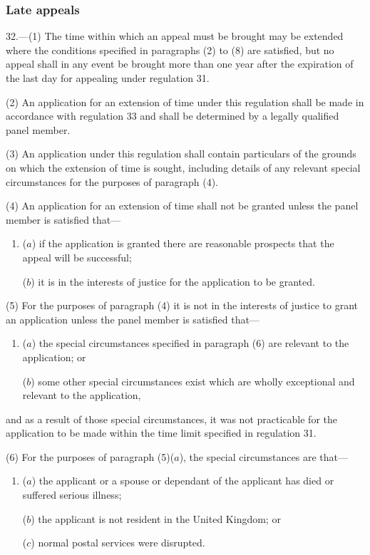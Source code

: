 \documentclass[12pt,a4paper]{article}
\begin{document}

\subsubsection[32. Late appeals]{Late appeals}

32.—(1) The time within which an appeal must be brought may be extended where the conditions specified in paragraphs (2) to (8) are satisfied, but no appeal shall in any event be brought more than one year after the expiration of the last day for appealing under regulation 31.

(2) An application for an extension of time under this regulation shall be made in accordance with regulation 33 and shall be determined by a legally qualified panel member.

(3) An application under this regulation shall contain particulars of the grounds on which the extension of time is sought, including details of any relevant special circumstances for the purposes of paragraph (4).

(4) An application for an extension of time shall not be granted unless the panel member is satisfied that—
\begin{enumerate}\item[]
($a$) if the application is granted there are reasonable prospects that the appeal will be successful;

($b$) it is in the interests of justice for the application to be granted.
\end{enumerate}

(5) For the purposes of paragraph (4) it is not in the interests of justice to grant an application unless the panel member is satisfied that—
\begin{enumerate}\item[]
($a$) the special circumstances specified in paragraph (6) are relevant to the application; or

($b$) some other special circumstances exist which are wholly exceptional and relevant to the application,
\end{enumerate}
and as a result of those special circumstances, it was not practicable for the application to be made within the time limit specified in regulation 31.

(6) For the purposes of paragraph (5)($a$), the special circumstances are that—
\begin{enumerate}\item[]
($a$) the applicant or a spouse or dependant of the applicant has died or suffered serious illness;

($b$) the applicant is not resident in the United Kingdom; or

($c$) normal postal services were disrupted.
\end{enumerate}
\end{document}
